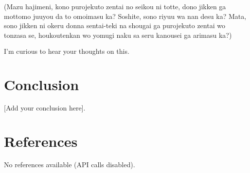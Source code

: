 \documentclass{article}
\begin{document}
(Mazu hajimeni, kono purojekuto zentai no seikou ni totte, dono jikken ga mottomo juuyou da to omoimasu ka? Soshite, sono riyuu wa nan desu ka? Mata, sono jikken ni okeru donna sentai-teki na shougai ga purojekuto zentai wo tonzasa se, houkoutenkan wo yomugi naku sa seru kanousei ga arimasu ka?)

I'm curious to hear your thoughts on this.


\section{Conclusion}
[Add your conclusion here].

\section{References}
No references available (API calls disabled).
\end{document}
